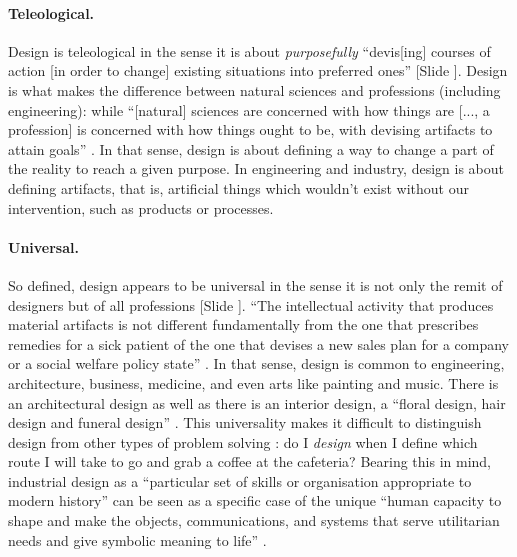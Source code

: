 \documentclass{article}
\newcounter{slide}
\begin{document}
\paragraph{Teleological.} Design is teleological in the sense it is about \emph{purposefully} ``devis[ing] courses of action [in order to change] existing situations into preferred ones'' \cite[p. 111]{simon1996sciences} {\color{blue}[Slide ]}. Design is what makes the difference between natural sciences and professions (including engineering): while ``[natural] sciences are concerned with how things are [..., a profession] is concerned with how things ought to be, with devising artifacts to attain goals'' \cite[p. 114]{simon1996sciences}. In that sense, design is about defining a way to change a part of the reality to reach a given purpose. In engineering and industry, design is about defining artifacts, that is, artificial things which wouldn't exist without our intervention, such as products or processes. 

\paragraph{Universal.} So defined, design appears to be universal in the sense it is not only the remit of designers but of all professions {\color{blue}[Slide ]}. ``The intellectual activity that produces material artifacts is not different fundamentally from the one that prescribes remedies for a sick patient of the one that devises a new sales plan for a company or a social welfare policy state'' \cite[p. 111]{simon1996sciences}. In that sense, design is common to engineering, architecture, business, medicine, and even arts like painting and music. There is an architectural design as well as there is an interior design, a ``floral design, hair design and funeral design'' \cite{heskett2001past}. This universality makes it difficult to distinguish design from other types of problem solving \cite{hatchuel2003new}: do I \emph{design} when I define which route I will take to go and grab a coffee at the cafeteria? Bearing this in mind, industrial design as a ``particular set of skills or organisation appropriate to modern history'' can be seen as a specific case of the unique ``human capacity to shape and make the objects, communications, and systems that serve utilitarian needs and give symbolic meaning to life'' \cite{heskett2001past}.
\end{document}
